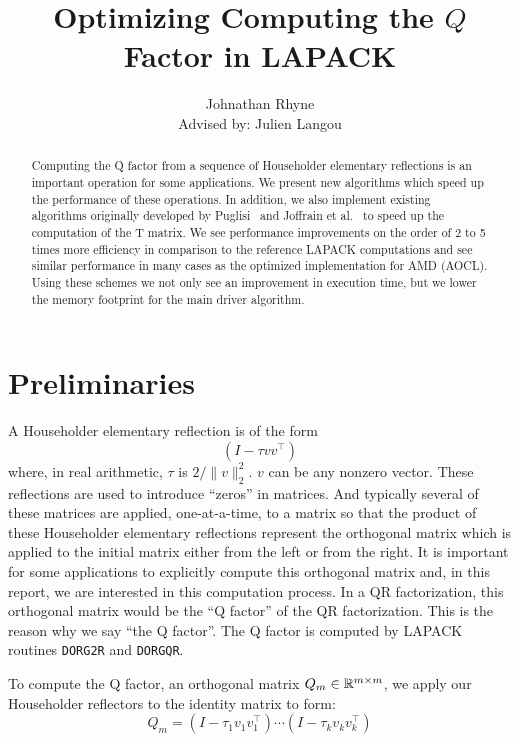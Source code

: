\documentclass[12pt]{article}
\date{}
\title{Optimizing Computing the $Q$ Factor in LAPACK}
\author{Johnathan Rhyne\\ Advised by: Julien Langou}
\begin{document}
    \maketitle
    \begin{abstract}
    Computing the Q factor from a sequence of Householder elementary reflections is an important operation for some 
    applications. We present new algorithms which speed up the performance of these operations. In addition, we also 
    implement existing algorithms originally developed by Puglisi~\cite{Puglisi} and Joffrain et al.~\cite{Joff} to speed up the computation of the T matrix. We see 
    performance improvements on the order of 2 to 5 times more efficiency in comparison to the reference LAPACK 
    computations and see similar performance in many cases as the optimized implementation for AMD (AOCL). Using these 
    schemes we not only see an improvement in execution time, but we lower the memory footprint for the main driver 
    algorithm.
    \end{abstract}


    \section{Preliminaries}
    A Householder elementary reflection is of the form
    \begin{equation}\label{eq:elementary}
        \left(I - \tau vv^\top\right)
    \end{equation}
    where, in real arithmetic, $\tau$ is $2/\|v\|_2^2$. $v$ can be any nonzero vector.
    These reflections are used to introduce ``zeros'' in matrices. And typically several of these matrices are applied, one-at-a-time, 
    to a matrix so that the product of these Householder elementary reflections represent the orthogonal matrix which is applied to
    the initial matrix either from the left or from the right. It is important for some applications to explicitly compute this orthogonal matrix and, in this report, we are interested in
    this computation process. In a QR factorization, this orthogonal matrix would be the ``Q factor'' of the QR factorization. This is the 
    reason why we say ``the Q factor''. The Q factor is computed by LAPACK routines \verb|DORG2R| and \verb|DORGQR|.

    To compute the Q factor, an orthogonal matrix $Q_m\in\mathbb{R}^{m\times m}$, we apply our Householder reflectors to the identity matrix to form:
    \begin{equation}\label{eq:Q}
        Q_m = \left(I - \tau_1 v_1v_1^\top\right)\cdots\left(I - \tau_kv_kv_k^\top\right)
    \end{equation}
\end{document}
